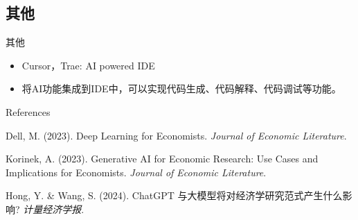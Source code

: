 \documentclass{beamer}
\begin{document}
\subsection{其他}
\begin{frame}{其他}
  \begin{itemize}
    \item Cursor，Trae: AI powered IDE
    \item 将AI功能集成到IDE中，可以实现代码生成、代码解释、代码调试等功能。
  \end{itemize}
\end{frame}

\begin{frame}{References}
  \footnotesize
  \begin{thebibliography}{10}

    Dell, M. (2023).
    \newblock Deep Learning for Economists.
    \newblock \emph{Journal of Economic Literature}.

    Korinek, A. (2023).
    \newblock Generative AI for Economic Research: Use Cases and Implications for Economists.
    \newblock \emph{Journal of Economic Literature}.

    Hong, Y. \& Wang, S. (2024).
    \newblock ChatGPT 与大模型将对经济学研究范式产生什么影响?
    \newblock \emph{计量经济学报}.

  \end{thebibliography}
\end{frame}
\end{document}
